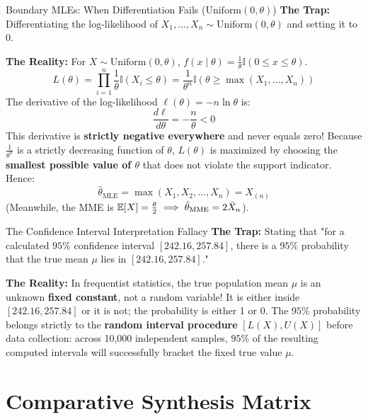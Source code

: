 \begin{trapbox}{Boundary MLEs: When Differentiation Fails ($\text{Uniform}(0, \theta)$)}
\textbf{The Trap:} Differentiating the log-likelihood of $X_1, \dots, X_n \sim \text{Uniform}(0, \theta)$ and setting it to 0.

\textbf{The Reality:} For $X \sim \text{Uniform}(0, \theta)$, $f(x \mid \theta) = \frac{1}{\theta} \mathbb{I}(0 \le x \le \theta)$.
$$L(\theta) = \prod_{i=1}^n \frac{1}{\theta} \mathbb{I}(X_i \le \theta) = \frac{1}{\theta^n} \mathbb{I}(\theta \ge \max(X_1, \dots, X_n))$$
The derivative of the log-likelihood $\ell(\theta) = -n \ln \theta$ is:
$$\frac{d\ell}{d\theta} = -\frac{n}{\theta} < 0$$
This derivative is \textbf{strictly negative everywhere} and never equals zero! Because $\frac{1}{\theta^n}$ is a strictly decreasing function of $\theta$, $L(\theta)$ is maximized by choosing the \textbf{smallest possible value of $\theta$} that does not violate the support indicator. Hence:
$$\hat{\theta}_{\text{MLE}} = \max(X_1, X_2, \dots, X_n) = X_{(n)}$$
(Meanwhile, the MME is $\mathbb{E}[X] = \frac{\theta}{2} \implies \hat{\theta}_{\text{MME}} = 2\bar{X}_n$).
\end{trapbox}

\begin{trapbox}{The Confidence Interval Interpretation Fallacy}
\textbf{The Trap:} Stating that "for a calculated $95\%$ confidence interval $[242.16, 257.84]$, there is a $95\%$ probability that the true mean $\mu$ lies in $[242.16, 257.84]$."

\textbf{The Reality:} In frequentist statistics, the true population mean $\mu$ is an unknown \textbf{fixed constant}, not a random variable! It is either inside $[242.16, 257.84]$ or it is not; the probability is either 1 or 0.
The $95\%$ probability belongs strictly to the \textbf{random interval procedure} $[L(X), U(X)]$ before data collection: across 10,000 independent samples, $95\%$ of the resulting computed intervals will successfully bracket the fixed true value $\mu$.
\end{trapbox}

\section{Comparative Synthesis Matrix}

